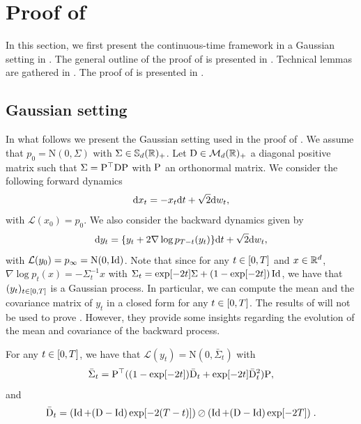 \section{Proof of }
\label{sec:proof-section21}

In this section, we first present the continuous-time framework in a Gaussian
setting in . The general outline of the proof of
 is presented in
. Technical lemmas are gathered in
. The proof of  is
presented in .

\subsection{Gaussian setting}
\label{sec:gaussian-setting-1}

In what follows we present the Gaussian setting used in the proof of
. We assume that $p_0 = \mathrm{N}(0, \Sigma)$
with $\Sigma \in \mathbb{S}_d(\mathbb{R})_+$.  Let $\mathrm{D} \in \mathcal{M}_d(\mathbb{R})_+$
a diagonal positive matrix such that $\Sigma = \mathrm{P}^\top \mathrm{D} \mathrm{P}$ with $\mathrm{P}$
an orthonormal matrix. We consider the following forward dynamics
\begin{equation}
  \mathrm{d} x_t = - x_t \mathrm{d} t + \sqrt{2} \mathrm{d} w_t ,
\end{equation}
with $\mathcal{L}(x_0) = p_0$.
We also consider the backward dynamics given by
\begin{equation}
  \mathrm{d} y_t = \{ y_t + 2\nabla \log p_{T-t}(y_t)\} \mathrm{d} t + \sqrt{2} \mathrm{d} w_t ,
\end{equation}
with $\mathcal{L}(y_0) = p_\infty = \mathrm{N}(0, \operatorname{Id})$. Note that since for any
$t \in \left[0,T\right]$ and $x \in \mathbb{R}^d$, $\nabla \log p_t(x) = - \Sigma_t^{-1}x$
with $\Sigma_t = \exp[-2t]\Sigma + (1-\exp[-2t]) \operatorname{Id}$, we have that
$(y_t)_{t \in \left[0,T\right]}$ is a Gaussian process. In particular, we can compute
the mean and the covariance matrix of $y_t$ in a closed form for any
$t \in \left[0,T\right]$. The results of  will
not be used to prove . However, they provide some
insights regarding the evolution of the mean and covariance of the backward
process.

\begin{proposition}
  \label{sec:gaussian-setting-continuous}
  For any $t \in \left[0,T\right]$, we have that
  $\mathcal{L}(y_t) = \mathrm{N}(0, \bar{\Sigma}_t)$ with
  \begin{equation}
    \bar{\Sigma}_t = \mathrm{P}^\top ((1 - \exp[-2t])\bar{\mathrm{D}}_t + \exp[-2t] \bar{\mathrm{D}}_t^2) \mathrm{P},
  \end{equation}
  and
  \begin{equation}
    \bar{\mathrm{D}}_t = (\operatorname{Id} + (\mathrm{D} - \operatorname{Id})\exp[-2(T-t)]) \oslash (\operatorname{Id} + (\mathrm{D} - \operatorname{Id})\exp[-2T]) \; . 
  \end{equation}
\end{proposition}

